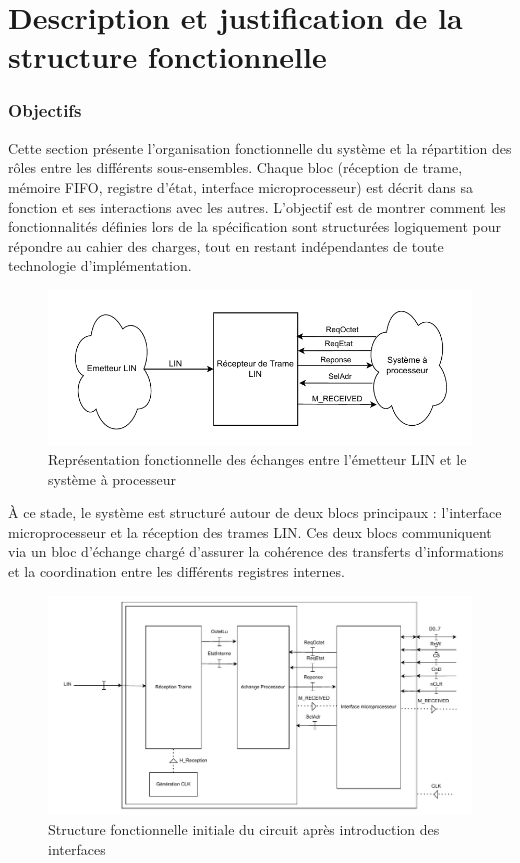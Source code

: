 \section{Description et justification de la structure fonctionnelle}

\subsubsection*{Objectifs}

Cette section présente l'organisation fonctionnelle du système et la répartition des rôles entre les différents sous-ensembles. Chaque bloc (réception de trame, mémoire FIFO, registre d'état, interface microprocesseur) est décrit dans sa fonction et ses interactions avec les autres.  
L'objectif est de montrer comment les fonctionnalités définies lors de la spécification sont structurées logiquement pour répondre au cahier des charges, tout en restant indépendantes de toute technologie d'implémentation.

\begin{figure}[H]
    \centering
    \includegraphics[width=0.8\linewidth]{images/inter/Structure_Fonc_Circuit.pdf}
    \caption{Représentation fonctionnelle des échanges entre l'émetteur LIN et le système à processeur}
    \label{fig:structure_fonc}
\end{figure}

À ce stade, le système est structuré autour de deux blocs principaux :  
l'interface microprocesseur et la réception des trames LIN.  
Ces deux blocs communiquent via un bloc d'échange chargé d'assurer la cohérence des transferts d'informations et la coordination entre les différents registres internes.

\begin{figure}[H]
    \centering
    \includegraphics[width=0.8\linewidth]{images/inter/Schema_base_circuit.pdf}
    \caption{Structure fonctionnelle initiale du circuit après introduction des interfaces}
    \label{fig:schema_base_circuit}
\end{figure}

